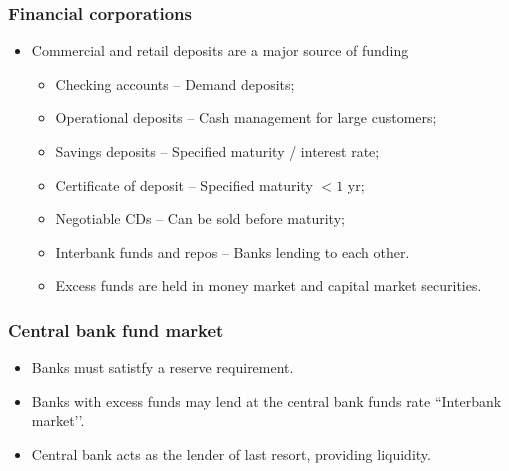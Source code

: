 \documentclass[../notes_compiled.tex]{subfiles}
\begin{document}
\subsubsection{Financial corporations}
\begin{itemize}
\item Commercial and retail deposits are a major source of funding
\begin{itemize}
\item Checking accounts -- Demand deposits;
\item Operational deposits -- Cash management for large customers;
\item Savings deposits -- Specified maturity / interest rate;
\item Certificate of deposit -- Specified maturity $<1$ yr;
\item Negotiable CDs -- Can be sold before maturity;
\item Interbank funds and repos -- Banks lending to each other.
\item[] Excess funds are held in money market and capital market securities.
\end{itemize}
\end{itemize}

\subsubsection*{Central bank fund market}
\begin{itemize}
\item Banks must satistfy a reserve requirement.
\item Banks with excess funds may lend at the central bank funds rate ``Interbank market’’.
\item Central bank acts as the lender of last resort, providing liquidity.
\end{itemize}
\end{document}
